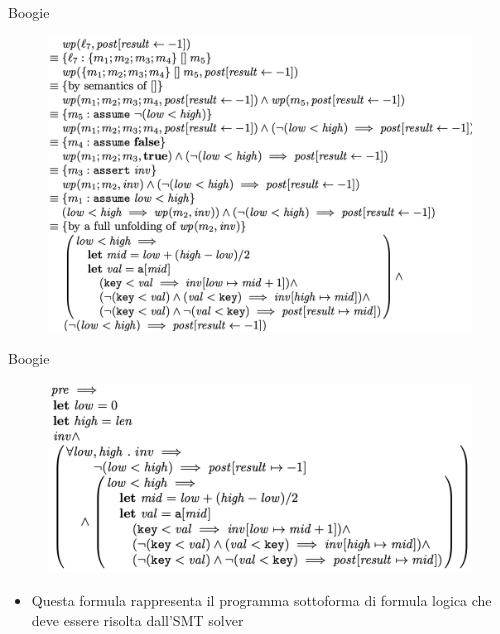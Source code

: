 \documentclass[]{beamer}
\begin{document}
\begin{frame}{Boogie}
\begin{figure}
    \centering
    \includegraphics[scale=0.4]{assets/img/wp2.png}
\end{figure}
\end{frame}

\begin{frame}{Boogie}
\begin{figure}
    \centering
    \includegraphics[scale=0.5]{assets/img/wp3.png}
\end{figure}
\begin{itemize}
    \item Questa formula rappresenta il programma sottoforma di formula logica che deve essere risolta dall'SMT solver
\end{itemize}
\end{frame}
\end{document}
